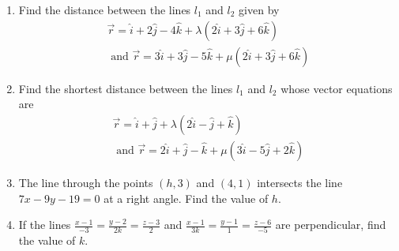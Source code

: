 \begin{enumerate}[label=\thesubsection.\arabic*, ref=\thesubsection.\theenumi]
\item Find the distance between the lines $l_1$ and $l_2$ given by
\begin{align}
\overrightarrow{r}= \hat{i}+ 2 \hat{j}- 4 \hat{k}+ \lambda(2 \hat{i}+ 3 \hat{j}+ 6 \hat{k}) \\
\text{ and }\overrightarrow{r}= 3 \hat{i}+ 3 \hat{j}- 5 \hat{k}+ \mu(2 \hat{i}+ 3 \hat{j}+ 6 \hat{k}) 
\end{align}
\item Find the shortest distance between the lines $l_1$ and $l_2$ whose vector equations are
\begin{align}
\overrightarrow{r}= \hat{i}+ \hat{j}+ \lambda(2 \hat{i}- \hat{j}+ \hat{k}) \\
\text{ and } \overrightarrow{r}= 2 \hat{i}+ \hat{j}- \hat{k}+ \mu(3 \hat{i}- 5 \hat{j}+ 2 \hat{k}) 
\end{align}
\item The line through the points $(h,   3)$ and $(4,   1)$ intersects the line $7x- 9y- 19= 0$ at a right angle. Find the value of $h$.
\label{chapters/11/10/3/10}
\\
\solution

	\item If the lines $\frac{x-1}{-3} = \frac{y-2}{2k} = \frac{z-3}{2}$ and  $\frac{x-1}{3k} = \frac{y-1}{1} = \frac{z-6}{-5}$ are perpendicular,   find the value of $k$.\\
    \solution
		
\end{enumerate}

